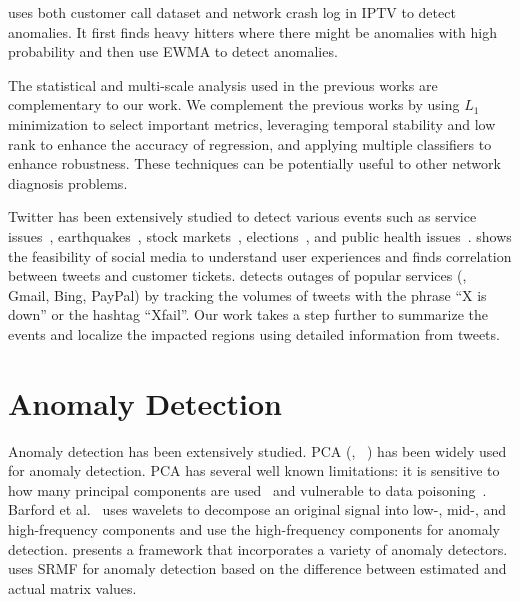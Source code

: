 \cite{Tiresias} uses both customer call dataset and network
crash log in IPTV to detect anomalies. It first finds heavy hitters
where there might be anomalies with high probability and then use EWMA
to detect anomalies.

The statistical and multi-scale analysis used in the previous works are
complementary to our work. We complement the previous works by using
$L_1$ minimization to select important metrics, leveraging temporal
stability and low rank to enhance the accuracy of regression, and
applying multiple classifiers to enhance robustness. These techniques
can be potentially useful to other network diagnosis problems.

Twitter has been extensively studied to detect various events %
such as service issues~\cite{listentome, online-services}, earthquakes~\cite{earthquake}, 
stock markets~\cite{stock2}, elections~\cite{election10}, and public health issues~\cite{publichealth}.
\cite{listentome} shows the feasibility of social media to 
understand user experiences and finds correlation between tweets and customer tickets. 
\cite{online-services} detects outages of popular services (\eg, Gmail, Bing, PayPal)
by tracking the volumes of tweets with the phrase ``X is down'' or the hashtag ``Xfail''.
Our work takes a step further to summarize the events and localize the impacted regions 
using detailed information from tweets. 


\section{Anomaly Detection}
\label{sec:rel_anomaly_det}

Anomaly detection has been extensively
studied. PCA (\eg, ~\cite{PCA1,PCA2,PCA3}) has been widely used for anomaly
detection. PCA has several well known limitations: it is sensitive
to how many principal components are used~\cite{PCA-sensitivity} and
vulnerable to data poisoning~\cite{PCA-data-poison}.
Barford et al.~\cite{barford-wavelet} uses wavelets to decompose
an original signal into low-, mid-, and high-frequency
components and use the high-frequency components for anomaly
detection. \cite{anomography} presents a framework that incorporates a
variety of anomaly detectors. \cite{zhang09sensing} uses SRMF for anomaly
detection based on the difference between estimated and actual matrix values.

